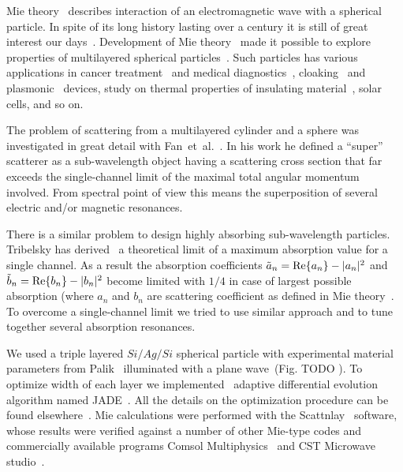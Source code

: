 \documentclass[aps,prl,twocolumn,showpacs,superscriptaddress,groupedaddress]{revtex4-1}
\begin{document}
\maketitle %

Mie theory~\cite{Mie-1908} describes interaction of an electromagnetic
wave with a spherical particle.  In spite of its long history lasting
over a century it is still of great interest our
days~\cite{Suzuki-2008,MacKowski-2012,Lerme-2000,Xu-2005,Li-2006,Gogoi-2010,Santiago-2011}.
Development of Mie theory~\cite{Yang-2003, Pena-scattnlay-2009} made
it possible to explore properties of multilayered spherical
particles~\cite{Sheehan-2013,Selmke-2012}. Such particles has various
applications in cancer treatment~\cite{Zhang-2010, Hirsch-2003} and
medical diagnostics~\cite{Allain-2002},
cloaking~\cite{Qui-2009,Semouchkina-2013, Ladutenko-2014} and
plasmonic~\cite{Martin-2013, Alu-2005} devices, study on thermal
properties of insulating material~\cite{Xie-2013}, solar cells\cite{Kameya-2011,Mann-2011},
and so on.

The problem of scattering from a multilayered cylinder and a sphere
was investigated in great detail with Fan~et~al.~\cite{Fan-2010,Fan-2011}.
In his work he defined a ``super'' scatterer as a sub-wavelength object
having a scattering cross section that far exceeds the single-channel
limit of the maximal total angular momentum involved.  From spectral
point of view this means the superposition of several electric and/or
magnetic resonances.

There is a similar problem to design highly absorbing sub-wavelength
particles.  Tribelsky has derived~\cite{Tribelsky-2011} a theoretical
limit of a maximum absorption value for a single channel.  As a result
the absorption coefficients $\tilde{a}_n= {\rm Re}\{a_n\} - |a_n|^2 $
and $\tilde{b}_n= {\rm Re}\{b_n\} - |b_n|^2 $ become limited with
$1/4$ in case of largest possible absorption (where $a_n$ and $b_n$
are scattering coefficient as defined in Mie
theory~\cite{Bohren-1983}.  To overcome a single-channel limit we
tried to use similar approach and to tune together several absorption
resonances.

We used a triple layered $Si/Ag/Si$ spherical particle with
experimental material parameters from Palik~\cite{palik-1997}
illuminated with a plane wave~(Fig. TODO ).  To optimize width of each
layer we implemented~\cite{JADE-web} adaptive differential
evolution~\cite{Storn-DE-first-1997} algorithm named
JADE~\cite{Jingqiao-JADE-2009}.  All the details on the optimization
procedure can be found elsewhere~\cite{Ladutenko-2014}.  Mie
calculations were performed with the
Scattnlay~\cite{Pena-scattnlay-2009,Scattnlay-web} software, whose results were
verified against a number of other Mie-type codes and commercially
available programs Comsol Multiphysics~\cite{Comsol-web} and CST Microwave
studio~\cite{CST-web}.
\end{document}
